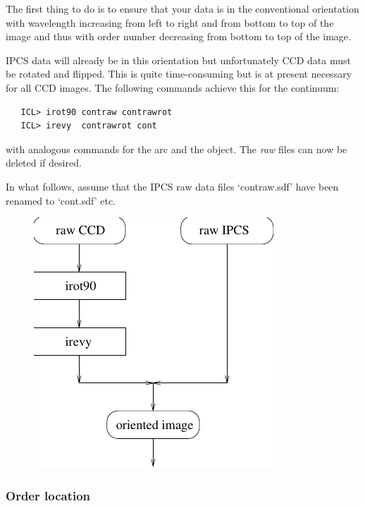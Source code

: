 \documentclass[11pt,twoside]{article}
\newcommand{\htmladdimg}[1]{}
\newenvironment{latexonly}{}{}
\begin{document}
   The first thing to do is to ensure that your data is in the
   conventional orientation with wavelength increasing from left to
   right and from bottom to top of the image and thus with order number
   decreasing from bottom to top of the image.

   IPCS data will already be in this orientation but unfortunately CCD
   data must be rotated and flipped. This is quite time-consuming but is
   at present necessary for all CCD images. The following commands
   achieve this for the continuum:

\begin{verbatim}
   ICL> irot90 contraw contrawrot
   ICL> irevy  contrawrot cont
\end{verbatim}

   with analogous commands for the arc and the object. The {\em raw\/}
   files can now be deleted if desired.

   In what follows, assume that the IPCS raw data files `contraw.sdf' have
   been renamed to `cont.sdf' etc.

\begin{latexonly}
\begin{figure}[htb]
\begin{center}
\includegraphics{sun86_ech1}
\end{center}
\end{figure}
\end{latexonly}
\htmladdimg{echelle1.png}


\subsubsection{\label{techno13locate}Order location}
\end{document}
